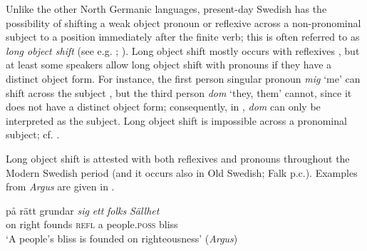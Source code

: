 \documentclass[output=paper]{langscibook}
\begin{document}
Unlike the other North Germanic languages, present-day Swedish has the possibility of shifting a weak object pronoun or reflexive across a non-pronominal subject to a position immediately after the finite verb; this is often referred to as \textit{long object shift} (see e.g. \citealt{Holmberg1986}; \citealt{Heinat2010}). Long object shift mostly occurs with reflexives , but at least some speakers allow long object shift with pronouns if they have a distinct object form. For instance, the first person singular pronoun \textit{mig} ‘me’ can shift across the subject , but the third person \textit{dom} ‘they, them’ cannot, since it does not have a distinct object form; consequently, in , \textit{dom} can only be interpreted as the subject. Long object shift is impossible across a pronominal subject; cf. .


\ea \label{ex:intro:20}




\z
\z


Long object shift is attested with both reflexives and pronouns throughout the Modern Swedish period (and it occurs also in Old Swedish; Falk p.c.). Examples from \textit{Argus} are given in .


\ea \label{ex:intro:21}
\ea
\gll  på rätt   grundar \textit{sig} \textit{ett} \textit{folks} \textit{Sällhet} \\
    on right founds    \textsc{refl}   a   people\textsc{.poss}   bliss\\
    \glt `A people’s bliss is founded on righteousness’ (\textit{Argus})
\end{document}
